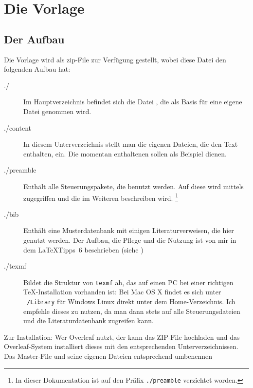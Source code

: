 
\thispagestyle{empty}
\section{Die Vorlage}\label{sec:section1}
\subsection{Der Aufbau}\label{subsec:aufbau}
Die Vorlage wird als zip-File zur Verfügung gestellt, wobei diese Datei den folgenden Aufbau hat:
%
\begin{description}
\item[./] Im Hauptverzeichnis befindet sich die Datei , die als Basis für eine eigene Datei genommen wird.

\item[./content] In diesem Unterverzeichnis stellt man die eigenen Dateien, die den Text enthalten, ein.
Die momentan enthaltenen sollen als Beispiel dienen.

\item[./preamble] Enthält alle Steuerungspakete, die benutzt werden. 
Auf diese wird mittels  zugegriffen und die im Weiteren beschreiben wird.%
\footnote{In dieser Dokumentation ist auf den Präfix \texttt{./preamble} verzichtet worden.} 

\item[./bib] Enthält eine Musterdatenbank mit einigen Literaturverweisen, die hier genutzt werden.
Der Aufbau, die Pflege und die Nutzung ist von mir in dem \LaTeX\-Tipps~6 beschrieben (siehe \cite{latextipps6})

\item[./texmf]
Bildet die Struktur von \texttt{texmf} ab, das auf einen PC bei einer richtigen \TeX-Installation vorhanden ist: 
Bei Mac OS X findet es sich unter \texttt{~/Library} für Windows \bzw Linux direkt unter dem Home-Verzeichnis.
Ich empfehle dieses zu nutzen, da man dann stets auf alle Steuerungsdateien und die Literaturdatenbank zugreifen kann.  

\end{description}
%
Zur Installation: Wer Overleaf nutzt, der kann das ZIP-File hochladen und das Overleaf-System installiert dieses mit den entsprechenden Unterverzeichnissen.
Das Master-File und seine eigenen Dateien entsprechend umbenennen

